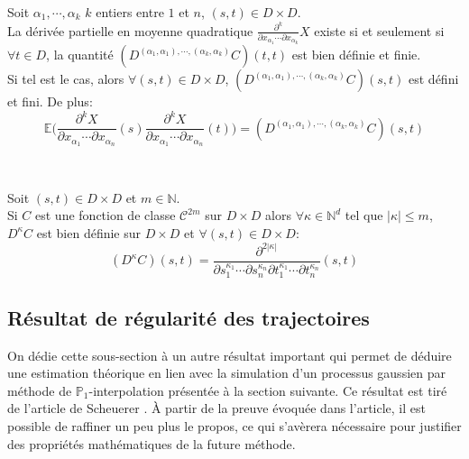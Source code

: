 \begin{corollary}
Soit $\alpha_1, \cdots , \alpha_k$ $k$ entiers entre $1$ et $n$, $(s,t) \in D \times D $.\\
\noindent La dérivée partielle en moyenne quadratique $\frac{\partial^{k}}{\partial x_{\alpha_1} \cdots \partial x_{\alpha_k} } X$ existe si et seulement si $\forall t \in D$, la quantité $(D^{(\alpha_1, \alpha_1), \cdots, (\alpha_k, \alpha_k)}C)(t,t)$ est bien définie et finie.\\

\noindent Si tel est le cas, alors $\forall (s,t) \in D \times D$, $(D^{(\alpha_1, \alpha_1), \cdots, (\alpha_k, \alpha_k)}C)(s,t)$ est défini et fini. De plus:
  \begin{equation} \mathbb{E}\biggl(\frac{\partial^{k}X}{\partial x_{\alpha_1} \cdots \partial x_{\alpha_n} } (s) \frac{\partial^{k}X}{\partial x_{\alpha_1} \cdots \partial x_{\alpha_n} }(t)\biggl) = (D^{(\alpha_1, \alpha_1), \cdots, (\alpha_k, \alpha_k)}C)(s,t) \end{equation}
\end{corollary}
~\\
\begin{property}
Soit $(s,t) \in D \times D $ et $m \in \mathbb{N}$.\\
\noindent Si $C$ est une fonction de classe $\mathcal{C}^{2m}$ sur $D \times D$ alors $\forall \kappa \in \mathbb{N}^d$ tel que $|\kappa| \leq m$,
$D^{\kappa}C$ est bien définie sur $D \times D$ et $\forall (s,t) \in D \times D$:
\begin{equation}
  (D^{\kappa}C)(s,t)= \frac{\partial^{2|\kappa|}}{\partial s_1^{\kappa_1} \cdots \partial s_n^{\kappa_n} \partial t_1^{\kappa_1} \cdots \partial t_n^{\kappa_n}} (s,t)
\end{equation}
\end{property}

\subsection{Résultat de régularité des trajectoires}

On dédie cette sous-section à un autre résultat important qui permet de déduire une estimation théorique en lien avec la simulation d'un processus gaussien par méthode de $\mathbb{P}_1$-interpolation présentée à la section suivante. Ce résultat est tiré de l'article de Scheuerer \cite{ScheuererMichael2010Rots}. \`A partir de la preuve
évoquée dans l'article, il est possible de raffiner un peu plus le propos, ce
qui s'avèrera nécessaire pour justifier des propriétés mathématiques de la future méthode.

